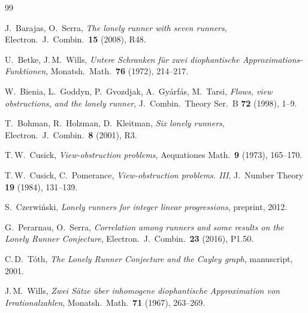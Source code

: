 \documentclass[12pt,a4paper]{amsart}
\theoremstyle{definition}
\theoremstyle{remark}
\begin{document}
\begin{thebibliography}{99}

J.~Barajas, O.~Serra,
\textit{The lonely runner with seven runners},
Electron.\ J.\ Combin.\ \textbf{15} (2008), R48.

U.~Betke, J.\,M.~Wills,
\textit{Untere Schranken für zwei diophantische Approximations-Funktionen},
Monatsh.\ Math.\ \textbf{76} (1972), 214--217.

W.~Bienia, L.~Goddyn, P.~Gvozdjak, A.~Gyárfás, M.~Tarsi,
\textit{Flows, view obstructions, and the lonely runner},
J.\ Combin.\ Theory Ser.\ B \textbf{72} (1998), 1--9.

T.~Bohman, R.~Holzman, D.~Kleitman,
\textit{Six lonely runners},
Electron.\ J.\ Combin.\ \textbf{8} (2001), R3.

T.\,W.~Cusick,
\textit{View-obstruction problems},
Aequationes Math.\ \textbf{9} (1973), 165--170.

T.\,W.~Cusick, C.~Pomerance,
\textit{View-obstruction problems. III},
J.\ Number Theory \textbf{19} (1984), 131--139.

S.~Czerwi\'nski,
\textit{Lonely runners for integer linear progressions},
preprint, 2012.

G.~Perarnau, O.~Serra,
\textit{Correlation among runners and some results on the Lonely Runner Conjecture},
Electron.\ J.\ Combin.\ \textbf{23} (2016), P1.50.

C.\,D.~Tóth,
\textit{The Lonely Runner Conjecture and the Cayley graph},
manuscript, 2001.

J.\,M.~Wills,
\textit{Zwei S\"atze \"uber inhomogene diophantische Approximation von Irrationalzahlen},
Monatsh.\ Math.\ \textbf{71} (1967), 263--269.

\end{thebibliography}
\end{document}
